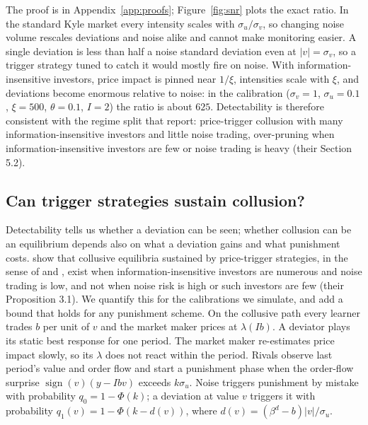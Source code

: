 
\noindent The proof is in Appendix~\ref{app:proofs}; Figure~\ref{fig:snr}
plots the exact ratio. In the standard Kyle
market every intensity scales with $\sigma_u/\sigma_v$, so changing noise
volume rescales deviations and noise alike and cannot make monitoring easier. A
single deviation is less than half a noise standard deviation even at
$|v|=\sigma_v$, so a trigger strategy tuned to catch it would mostly fire on
noise. With information-insensitive investors, price impact is pinned near
$1/\xi$, intensities scale with $\xi$, and deviations become enormous relative
to noise: in the \citet{dou2025} calibration ($\sigma_v=1$, $\sigma_u=0.1$,
$\xi=500$, $\theta=0.1$, $I=2$) the ratio is about $625$. Detectability
is therefore consistent with the regime split that \citet{dou2025} report:
price-trigger collusion with many information-insensitive investors and
little noise trading, over-pruning when information-insensitive investors are
few or noise trading is heavy (their Section 5.2).

\subsection{Can trigger strategies sustain collusion?}
\label{sec:sustain}

Detectability tells us whether a deviation can be seen; whether collusion
can be an equilibrium depends also on what a deviation gains and what
punishment costs. \citet{dou2025} show that collusive equilibria sustained by
price-trigger strategies, in the sense of \citet{green1984} and
\citet{abreu1990}, exist when information-insensitive investors are numerous
and noise trading is low, and not when noise risk is high or such investors
are few (their Proposition 3.1). We quantify this for the calibrations we
simulate, and add a bound that holds for any punishment scheme. On the
collusive path every learner trades $b$ per unit of $v$ and the market maker
prices at $\lambda(Ib)$. A deviator plays its static best response for one
period. The market maker re-estimates price impact slowly, so its $\lambda$
does not react within the period. Rivals observe last period's value and
order flow and start a punishment phase when the order-flow surprise
$\operatorname{sign}(v)(y-Ibv)$ exceeds $k\sigma_u$. Noise triggers
punishment by mistake with probability $q_0=1-\Phi(k)$; a deviation at
value $v$ triggers it with probability $q_1(v)=1-\Phi(k-d(v))$, where
$d(v)=(\beta^d-b)|v|/\sigma_u$.


